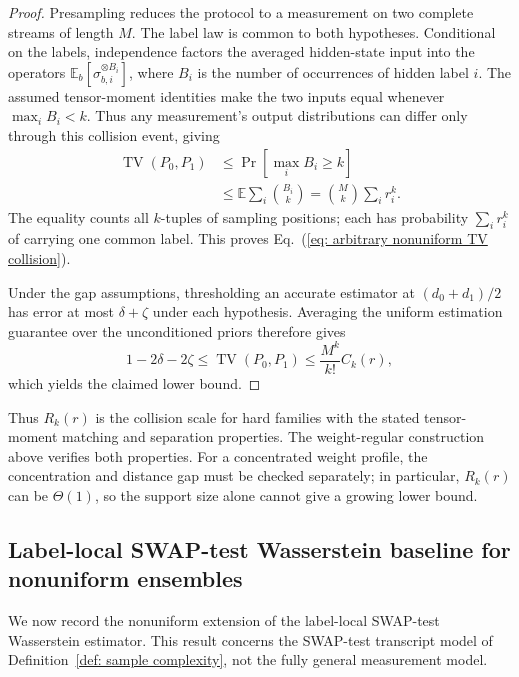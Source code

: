 \documentclass[aps,prx,reprint,superscriptaddress,amsmath,amssymb,longbibliography,floatfix]{revtex4-2}
\theoremstyle{plain}
\theoremstyle{definition}
\theoremstyle{remark}
\begin{document}
\begin{proof}
Presampling reduces the protocol to a measurement on two complete streams of length \(M\). The label law is common to both hypotheses. Conditional on the labels, independence factors the averaged hidden-state input into the operators \(\mathbb E_b[\sigma_{b,i}^{\otimes B_i}]\), where \(B_i\) is the number of occurrences of hidden label \(i\). The assumed tensor-moment identities make the two inputs equal whenever \(\max_iB_i<k\). Thus any measurement's output distributions can differ only through this collision event, giving
\[
\begin{aligned}
\operatorname{TV}(P_0,P_1)
    &\le\Pr\!\left[\max_iB_i\ge k\right]\\
    &\le\mathbb E\sum_i\binom{B_i}{k}
    =\binom{M}{k}\sum_i r_i^k.
\end{aligned}
\]
The equality counts all \(k\)-tuples of sampling positions; each has probability \(\sum_i r_i^k\) of carrying one common label. This proves Eq.~(\ref{eq: arbitrary nonuniform TV collision}).

Under the gap assumptions, thresholding an accurate estimator at \((d_0+d_1)/2\) has error at most \(\delta+\zeta\) under each hypothesis. Averaging the uniform estimation guarantee over the unconditioned priors therefore gives
\[
    1-2\delta-2\zeta
    \le\operatorname{TV}(P_0,P_1)
    \le\frac{M^k}{k!}C_k(r),
\]
which yields the claimed lower bound.
\end{proof}

Thus \(R_k(r)\) is the collision scale for hard families with the stated tensor-moment matching and separation properties. The weight-regular construction above verifies both properties. For a concentrated weight profile, the concentration and distance gap must be checked separately; in particular, \(R_k(r)\) can be \(\Theta(1)\), so the support size alone cannot give a growing lower bound.

\subsection{Label-local SWAP-test Wasserstein baseline for nonuniform ensembles}

We now record the nonuniform extension of the label-local SWAP-test Wasserstein estimator. This result concerns the SWAP-test transcript model of Definition~\ref{def: sample complexity}, not the fully general measurement model.
\end{document}
